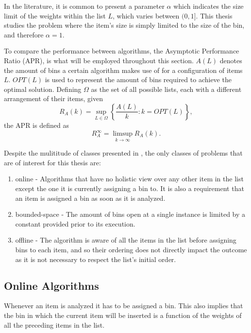 In the literature, it is common to present a parameter $\alpha$ which
indicates the size limit of the weights within the list $L$, which varies
between $(0, 1]$. This thesis studies the problem where the item's size is
simply limited to the size of the bin, and therefore $\alpha = 1$.

To compare the performance between algorithms, the Asymptotic Performance Ratio
(APR), is what will be employed throughout this section. $A(L)$ denotes the
amount of bins a certain algorithm makes use of for a configuration of items
$L$. $OPT(L)$ is used to represent the amount of bins required to achieve the
optimal solution. Defining $\Omega$ as the set of all possible lists, each with
a different arrangement of their items, given
\begin{equation}
    R_A (k) = \sup_{L \in \Omega} \left \{ \frac{A(L)}{k} : k = OPT(L) \right \},
\end{equation}
the APR is defined as
\begin{equation}
    R_A^\infty = \limsup_{k \to \infty} R_A(k).
\end{equation}

Despite the mulititude of classes presented in \cite{coffman2013bin}, the only
classes of problems that are of interest for this thesis are: 
\begin{enumerate}
    \item online - Algorithms that have no holistic view over any other item in
        the list except the one it is currently assigning a bin to. It is also a
        requirement that an item is assigned a bin as soon as it is analyzed.
    \item bounded-space - The amount of bins open at a single instance is
        limited by a constant provided prior to its execution.
    \item offline - The algorithm is aware of all the items in the list before
        assigning bins to each item, and so their ordering does not directly
        impact the outcome as it is not necessary to respect the list's initial
        order.
\end{enumerate}

\subsection{Online Algorithms}

Whenever an item is analyzed it has to be assigned a bin. This also implies that
the bin in which the current item will be inserted is a function of the weights
of all the preceding items in the list.

